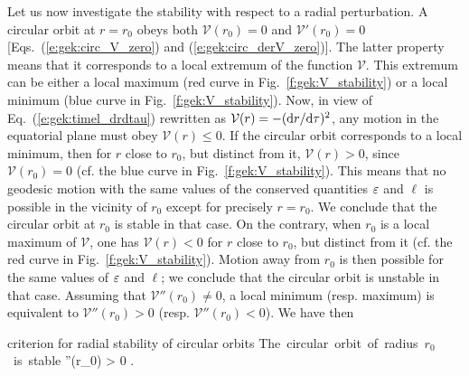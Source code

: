 Let us now investigate the stability with respect to a radial perturbation.
A circular orbit at $r=r_0$ obeys both $\mathcal{V}(r_0) = 0$ and $\mathcal{V}'(r_0) = 0$
[Eqs.~(\ref{e:gek:circ_V_zero}) and (\ref{e:gek:circ_derV_zero})]. The latter property means that
it corresponds to a local extremum of the function $\mathcal{V}$. This extremum can be either
a local maximum (red curve in Fig.~\ref{f:gek:V_stability}) or a local minimum
(blue curve in Fig.~\ref{f:gek:V_stability}).
Now, in view of Eq.~(\ref{e:gek:timel_drdtau}) rewritten as $\mathcal{V}(r) = - (\mathrm{d} r/ \mathrm{d}\tau)^2$, any motion in the equatorial plane must obey $\mathcal{V}(r) \leq 0$. If the circular orbit
corresponds to a local minimum, then for $r$ close to $r_0$, but distinct from it,
$\mathcal{V}(r) > 0$, since $\mathcal{V}(r_0) = 0$ (cf. the blue curve in Fig.~\ref{f:gek:V_stability}). This means that no geodesic motion with the same values of the
conserved quantities $\varepsilon$ and $\ell$
is possible in the vicinity of $r_0$ except for precisely $r=r_0$. We conclude that the circular orbit at $r_0$ is stable in that case.
On the contrary, when $r_0$ is a local maximum of $\mathcal{V}$, one has
$\mathcal{V}(r) < 0$
for $r$ close to $r_0$, but distinct from it (cf. the red curve in Fig.~\ref{f:gek:V_stability}).
Motion away from $r_0$ is then possible for the same values of $\varepsilon$ and $\ell$; we conclude that the circular orbit is unstable in that
case. Assuming that $\mathcal{V}''(r_0)\neq 0$, a local minimum (resp. maximum) is equivalent to
$\mathcal{V}''(r_0) > 0$ (resp. $\mathcal{V}''(r_0) < 0$). We have then
\begin{tprop}{criterion for radial stability of circular orbits}{}
\be \label{e:gek:stability_circ_V}
    \mbox{The circular orbit of radius $r_0$ is stable} \iff
    ''(r_0) > 0 .
\ee
\end{tprop}

